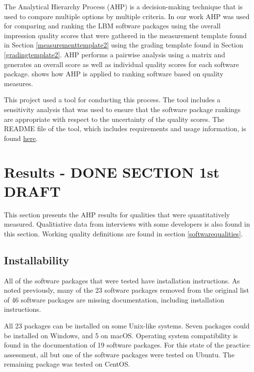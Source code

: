 \documentclass[12pt, notitlepage]{article}
\begin{document}
The Analytical Hierarchy Process (AHP) is a decision-making technique that is used to compare multiple options by multiple criteria. In our work AHP was used for comparing and ranking the LBM software packages using the overall impression quality scores that were gathered in the measurement template found in Section \ref{measurementtemplate2} using the grading template found in Section \ref{gradingtemplate2}. AHP performs a pairwise analysis using a matrix and generates an overall score as well as individual quality scores for each software package. \cite{SmithEtAl2016} shows how AHP is applied to ranking software based on quality measures. 

This project used a tool for conducting this process. The tool includes a sensitivity analysis that was used to ensure that the software package rankings are appropriate with respect to the uncertainty of the quality scores. The README file of the tool, which includes requirements and usage information, is found \href{https://github.com/smiths/AIMSS/blob/master/StateOfPractice/AHP2020/LBM/README.txt}{here}. 

\newpage
\section{Results - DONE SECTION 1st DRAFT}\label{qualityresults}

This section presents the AHP results for qualities that were quantitatively measured. Qualitiative data from interviews with some developers is also found in this section. Working quality definitions are found in section \ref{softwarequalities}.

\subsection{Installability}

All of the software packages that were tested have installation instructions. As noted previously, many of the 23 software packages removed from the original list of 46 software packages are missing documentation, including installation instructions. 

All 23 packages can be installed on some Unix-like systems. Seven packages could be installed on Windows, and 5 on macOS. Operating system compatibility is found in the documentation of 19 software packages. For this state of the practice assessment, all but one of the software packages were tested on Ubuntu. The remaining package was tested on CentOS.
\end{document}
